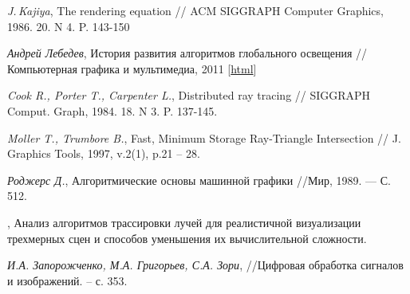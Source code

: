 \begin{thebibliography}{99}
  \textit{J.\,Kajiya}, The rendering equation
  // ACM SIGGRAPH Computer Graphics, 1986. 20. N 4. P. 143-150

  \textit{Андрей Лебедев}, История развития алгоритмов глобального освещения
  // Компьютерная графика и мультимедиа, 2011
  [\href{http://cgm.computergraphics.ru/issues/issue19/globalillum}
  {html}]

  \textit{Cook R., Porter T., Carpenter L.}, Distributed ray tracing
  // SIGGRAPH Comput. Graph, 1984. 18. N 3. P. 137-145.

  \textit{Moller T., Trumbore B.}, Fast, Minimum Storage Ray-Triangle Intersection 
  // J. Graphics Tools, 1997, v.2(1), p.21 -- 28.

  \textit{Роджерс Д.}, Алгоритмические основы машинной графики
  //Мир, 1989. — С. 512.

  , Анализ алгоритмов трассировки лучей для реалистичной визуализации трехмерных сцен и способов уменьшения их вычислительной сложности. 

  \textit{И.А. Запорожченко, М.А. Григорьев, С.А. Зори}, 
  //Цифровая обработка сигналов и изображений. – с. 353.
\end{thebibliography}
